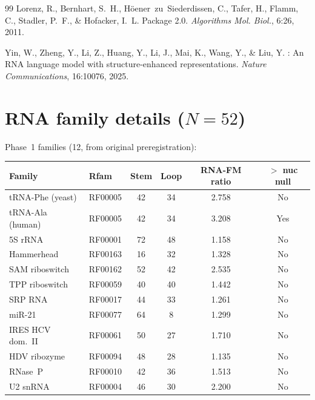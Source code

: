 \documentclass[11pt]{article}
\begin{document}
\begin{thebibliography}{99}
Lorenz, R., Bernhart, S.~H., H\"oener~zu~Siederdissen, C.,
  Tafer, H., Flamm, C., Stadler, P.~F., \& Hofacker, I.~L.
 Package 2.0.
\newblock \emph{Algorithms Mol. Biol.}, 6:26, 2011.

Yin, W., Zheng, Y., Li, Z., Huang, Y., Li, J., Mai, K.,
  Wang, Y., \& Liu, Y.
: An {RNA} language model with
  structure-enhanced representations.
\newblock \emph{Nature Communications}, 16:10076, 2025.

\end{thebibliography}


\appendix
\section{RNA family details ($N = 52$)}
\label{sec:appendix_families}

Phase~1 families (12, from original preregistration):

\begin{table}[h]
\centering
\small
\begin{tabular}{@{}llcccc@{}}
\toprule
\textbf{Family} & \textbf{Rfam} & \textbf{Stem} & \textbf{Loop} &
  \textbf{RNA-FM ratio} & \textbf{$>$ nuc null} \\
\midrule
tRNA-Phe (yeast)    & RF00005 & 42 & 34 & 2.758 & No \\
tRNA-Ala (human)    & RF00005 & 42 & 34 & 3.208 & Yes \\
5S rRNA             & RF00001 & 72 & 48 & 1.158 & No \\
Hammerhead          & RF00163 & 16 & 32 & 1.328 & No \\
SAM riboswitch      & RF00162 & 52 & 42 & 2.535 & No \\
TPP riboswitch      & RF00059 & 40 & 40 & 1.442 & No \\
SRP RNA             & RF00017 & 44 & 33 & 1.261 & No \\
miR-21              & RF00077 & 64 &  8 & 1.299 & No \\
IRES HCV dom.~II    & RF00061 & 50 & 27 & 1.710 & No \\
HDV ribozyme        & RF00094 & 48 & 28 & 1.135 & No \\
RNase~P             & RF00010 & 42 & 36 & 1.513 & No \\
U2 snRNA            & RF00004 & 46 & 30 & 2.200 & No \\
\bottomrule
\end{tabular}
\end{table}
\end{document}

